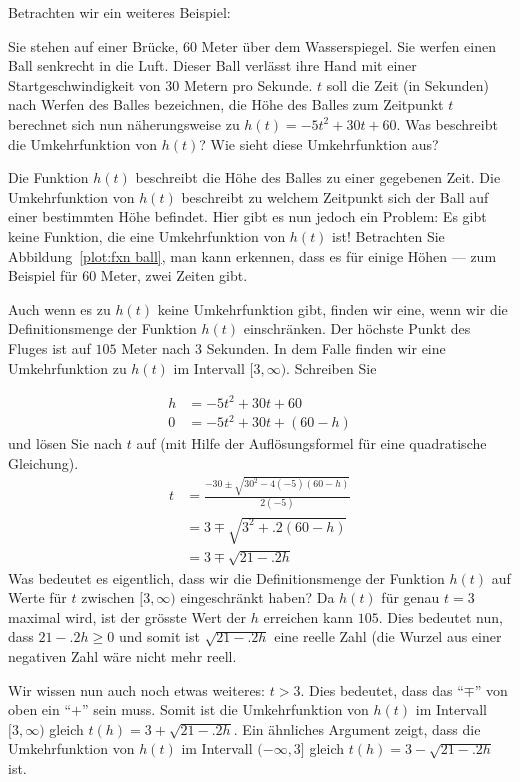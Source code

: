 Betrachten wir ein weiteres Beispiel:

\begin{example}\label{E:example-ball-bridge}

Sie stehen auf einer Brücke, 60 Meter über dem Wasserspiegel. Sie werfen einen Ball senkrecht in die Luft. Dieser Ball verlässt ihre Hand mit einer Startgeschwindigkeit von 30 Metern pro Sekunde. $t$ soll die Zeit (in Sekunden) nach Werfen des Balles bezeichnen, die Höhe des Balles zum Zeitpunkt $t$ berechnet sich nun näherungsweise zu $h(t)=-5 t^2 +30t +60$. Was beschreibt die Umkehrfunktion von $h(t)$? Wie sieht diese Umkehrfunktion aus?
\end{example}



\begin{solution}
Die Funktion $h(t)$ beschreibt die Höhe des Balles zu einer gegebenen Zeit. Die Umkehrfunktion von $h(t)$ beschreibt zu welchem Zeitpunkt sich der Ball auf einer bestimmten Höhe befindet. Hier gibt es nun jedoch ein Problem: Es gibt keine Funktion, die eine Umkehrfunktion von $h(t)$ ist! Betrachten Sie Abbildung~\ref{plot:fxn
  ball}, man kann erkennen, dass es für einige Höhen --- zum Beispiel für 60 Meter, zwei Zeiten gibt.

Auch wenn es zu $h(t)$ keine Umkehrfunktion gibt, finden wir eine, wenn wir die Definitionsmenge der Funktion $h(t)$ einschränken. Der höchste Punkt des Fluges ist auf $105$ Meter nach $3$ Sekunden. In dem Falle finden wir eine Umkehrfunktion zu $h(t)$ im Intervall $[3,\infty)$. Schreiben Sie

\begin{align*}
h &=  -5 t^2 +30t+60\\
0 &= -5 t^2 +30t+(60 - h)
\end{align*}
und lösen Sie nach $t$ auf (mit Hilfe der Auflösungsformel für eine quadratische Gleichung).
\begin{align*}
t &= \frac{-30\pm \sqrt{30^2 -4(-5)(60-h)}}{2(-5)}\\
&=3\mp \sqrt{3^2+ .2(60-h)}\\
&=3\mp \sqrt{21-.2h}
\end{align*} 
Was bedeutet es eigentlich, dass wir die Definitionsmenge der Funktion $h(t)$ auf Werte für $t$ zwischen $[3,\infty)$ eingeschränkt haben?
Da $h(t)$ für genau $t=3$ maximal wird, ist der grösste Wert der $h$ erreichen kann $105$. Dies bedeutet nun, dass $21-.2h \ge 0$ und somit ist $\sqrt{21-.2h}$ eine reelle Zahl (die Wurzel aus einer negativen Zahl wäre nicht mehr reell. 

Wir wissen nun auch noch etwas weiteres: $t>3$. Dies bedeutet, dass das ``$\mp$'' von oben ein ``$+$'' sein muss. Somit ist die Umkehrfunktion von $h(t)$ im Intervall $[3,\infty)$ gleich $t(h) = 3+ \sqrt{21-.2h}$. Ein ähnliches Argument zeigt, dass die Umkehrfunktion von $h(t)$ im Intervall $(-\infty, 3]$ gleich
  $t(h) = 3- \sqrt{21-.2h}$ ist.
\end{solution}

